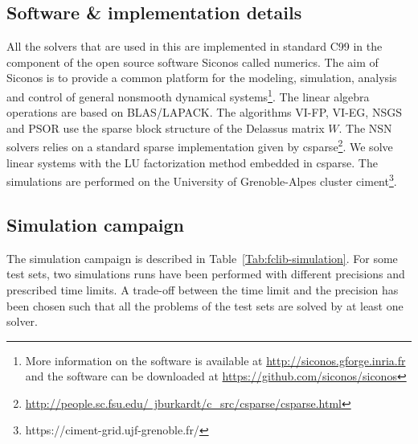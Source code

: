 

\subsection{Software \& implementation details}

All the solvers that are used in this \chapterorreport{} are implemented in standard C99 in the component of the open source software Siconos called numerics. The aim of Siconos is to provide a common platform for the modeling, simulation, analysis and control of general nonsmooth dynamical systems\footnote{More information on the software is available at \href{http://siconos.gforge.inria.fr}{http://siconos.gforge.inria.fr} and the software can be downloaded at  \href{https://github.com/siconos/siconos}{https://github.com/siconos/siconos}}. The linear algebra operations are based on BLAS/LAPACK. The algorithms {\sf VI-FP}, {\sf VI-EG}, {\sf NSGS} and {\sf PSOR} use the sparse block structure of the Delassus matrix $W$. The {\sf NSN} solvers relies on a standard sparse implementation given by csparse\footnote{\href{http://people.sc.fsu.edu/~jburkardt/c_src/csparse/csparse.html}{http://people.sc.fsu.edu/~jburkardt/c\_src/csparse/csparse.html}}.  We solve linear systems with the LU factorization method embedded in csparse. The simulations are performed on the University of Grenoble-Alpes cluster {\sc ciment}\footnote{https://ciment-grid.ujf-grenoble.fr/}.




\subsection{Simulation campaign}
The simulation campaign is described in Table~\ref{Tab:fclib-simulation}. For some test sets, two simulations runs have been performed with different precisions and prescribed time limits. A trade-off between the time limit and the precision has been chosen such that all the problems of the test sets are solved by at least one solver.


